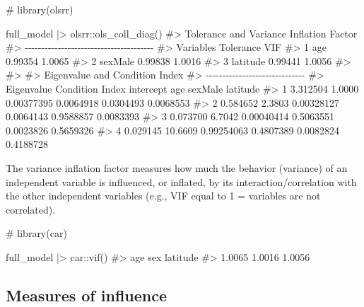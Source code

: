 \documentclass[
  12pt,
  a4paper,
  oneside]{tesesusp}
\newenvironment{Shaded}{\begin{snugshade}}{\end{snugshade}}
\newcommand{\CommentTok}[1]{\textcolor[rgb]{0.37,0.37,0.37}{#1}}
\newcommand{\FunctionTok}[1]{\textcolor[rgb]{0.28,0.35,0.67}{#1}}
\newcommand{\NormalTok}[1]{\textcolor[rgb]{0.00,0.23,0.31}{#1}}
\newcommand{\SpecialCharTok}[1]{\textcolor[rgb]{0.37,0.37,0.37}{#1}}
\begin{document}
\begin{Shaded}
\begin{Highlighting}[numbers=left,,]
\CommentTok{\# library(olsrr)}

\NormalTok{full\_model }\SpecialCharTok{|\textgreater{}}\NormalTok{ olsrr}\SpecialCharTok{::}\FunctionTok{ols\_coll\_diag}\NormalTok{()}
\CommentTok{\#\textgreater{} Tolerance and Variance Inflation Factor}
\CommentTok{\#\textgreater{} {-}{-}{-}{-}{-}{-}{-}{-}{-}{-}{-}{-}{-}{-}{-}{-}{-}{-}{-}{-}{-}{-}{-}{-}{-}{-}{-}{-}{-}{-}{-}{-}{-}{-}{-}{-}{-}{-}{-}}
\CommentTok{\#\textgreater{}   Variables Tolerance    VIF}
\CommentTok{\#\textgreater{} 1       age   0.99354 1.0065}
\CommentTok{\#\textgreater{} 2   sexMale   0.99838 1.0016}
\CommentTok{\#\textgreater{} 3  latitude   0.99441 1.0056}
\CommentTok{\#\textgreater{} }
\CommentTok{\#\textgreater{} }
\CommentTok{\#\textgreater{} Eigenvalue and Condition Index}
\CommentTok{\#\textgreater{} {-}{-}{-}{-}{-}{-}{-}{-}{-}{-}{-}{-}{-}{-}{-}{-}{-}{-}{-}{-}{-}{-}{-}{-}{-}{-}{-}{-}{-}{-}}
\CommentTok{\#\textgreater{}   Eigenvalue Condition Index  intercept       age   sexMale  latitude}
\CommentTok{\#\textgreater{} 1   3.312504          1.0000 0.00377395 0.0064918 0.0304493 0.0068553}
\CommentTok{\#\textgreater{} 2   0.584652          2.3803 0.00328127 0.0064143 0.9588857 0.0083393}
\CommentTok{\#\textgreater{} 3   0.073700          6.7042 0.00040414 0.5063551 0.0023826 0.5659326}
\CommentTok{\#\textgreater{} 4   0.029145         10.6609 0.99254063 0.4807389 0.0082824 0.4188728}
\end{Highlighting}
\end{Shaded}

The variance inflation factor measures how much the behavior (variance)
of an independent variable is influenced, or inflated, by its
interaction/correlation with the other independent variables (e.g., VIF
equal to 1 = variables are not correlated).

\begin{Shaded}
\begin{Highlighting}[numbers=left,,]
\CommentTok{\# library(car)}

\NormalTok{full\_model }\SpecialCharTok{|\textgreater{}}\NormalTok{ car}\SpecialCharTok{::}\FunctionTok{vif}\NormalTok{()}
\CommentTok{\#\textgreater{}      age      sex latitude }
\CommentTok{\#\textgreater{}   1.0065   1.0016   1.0056}
\end{Highlighting}
\end{Shaded}

\hypertarget{measures-of-influence-1}{%
\subsection{Measures of influence}\label{measures-of-influence-1}}
\end{document}
